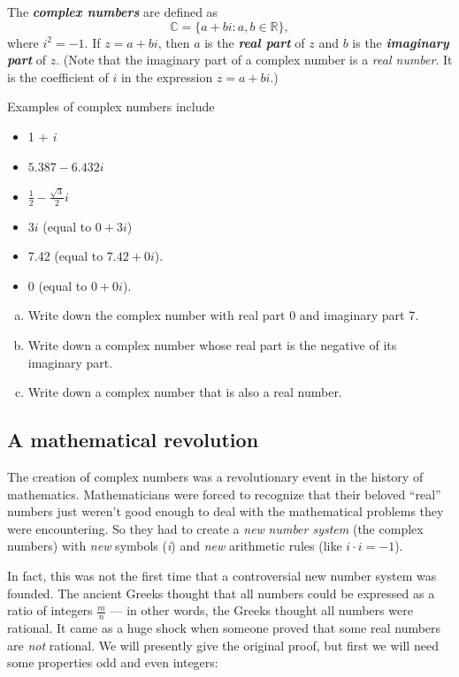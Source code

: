 \begin{defn}
The \textbf{\textit{complex numbers}} are defined
as 
\[
{\mathbb{C}}=\{a+bi:a,b\in{\mathbb{R}}\},\]
 where $i^{2}=-1$. If $z=a+bi$, then $a$ is the \textbf{\emph{real
part}} of $z$ and $b$ is the \textbf{\emph{imaginary part}} of $z$. (Note that the imaginary part of a complex number is a \emph{real number}. It is the coefficient of $i$ in the expression $z = a + bi$.)
\end{defn}

\bigskip

 Examples of complex numbers include 
\begin{itemize}
\item 1 + \emph{i} 
\item $5.387-6.432i$ 
\item $\frac{1}{2}-\frac{\sqrt{3}}{2}i$ 
\item $3i$ (equal to $0+3i$) 
\item 7.42 (equal to $7.42+0i$).
\item 0 (equal to $0+0i$).
\end{itemize}
\begin{exercise}\label{exercise:complex:1}
\begin{enumerate}[(a)]
\item
Write down the complex number with real part 0 and imaginary part 7.
\item
Write down a complex number whose real part is the negative of its imaginary part.
\item
Write down a complex number that is also a real number.
\end{enumerate}
\end{exercise}

\subsection{A mathematical revolution}

The creation of complex numbers was a revolutionary event in
the history of mathematics. Mathematicians were forced to recognize
that their beloved ``real'' numbers just weren't good enough to
deal with the mathematical problems they were encountering. So they
had to create a \emph{new} \emph{number system} (the complex numbers)
with\emph{ new} symbols (\emph{i}) and \emph{new} arithmetic rules
(like $i\cdot i=-1$).

In fact, this was not the first time that a controversial new number
system was founded. The ancient Greeks thought that all numbers could
be expressed as a ratio of integers $\frac{m}{n}$ --- in other words, the Greeks thought all numbers were rational.  It came as a huge
shock when someone proved that some real numbers are \emph{not} rational. We will presently give the original proof, but first we will need some properties odd and even integers:

